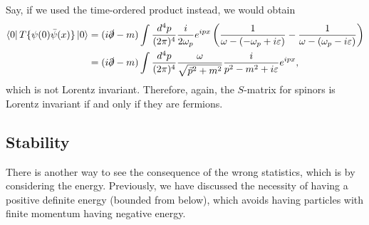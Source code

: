 \documentclass[11pt]{article}
\theoremstyle{definition}
\begin{document}
Say, if we used the time-ordered product instead, we would obtain
\begin{equation}
    \begin{aligned}
        \bra{0}T\{\psi(0)\bar{\psi}(x)\}\ket{0} &= (i\slashed{\partial}-m)\int\frac{d^{4}p}{(2\pi)^{4}}\frac{i}{2\omega_p}e^{ipx}\left(\frac{1}{\omega-(-\omega_p+i\varepsilon)} - \frac{1}{\omega-(\omega_p-i\varepsilon)}   \right) \\
        &= (i\slashed{\partial}-m)\int \frac{d^4p}{(2\pi)^4}\frac{\omega}{\sqrt{\vec{p}^2+m^2}}\frac{i}{p^2-m^2+i\varepsilon}e^{ipx},
    \end{aligned}
\end{equation}
which is not Lorentz invariant. Therefore, again, the $S$-matrix for spinors is Lorentz invariant if and only if they are fermions.

\subsection{Stability}
There is another way to see the consequence of the wrong statistics, which is by considering the energy. Previously, we have discussed the necessity of having a positive definite energy (bounded from below), which avoids having particles with finite momentum having negative energy.
\end{document}
